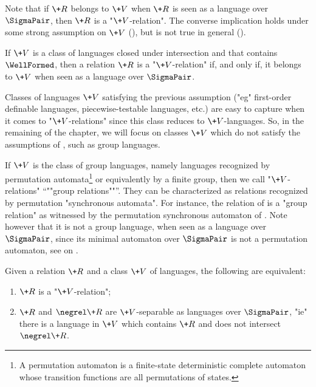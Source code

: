 Note that if $\+R$ belongs to $\+V$ when $\+R$ is seen as a language over $\SigmaPair$,
then $\+R$ is a "$\+V$-relation".
The converse implication holds under some strong assumption on $\+V$ (),
but is not true in general ().

\begin{fact}
	\AP\label{fact:a-triviality-on-trivial-relations}
	If $\+V$ is a class of languages closed under intersection and that contains $\WellFormed$, then
	a relation $\+R$ is a "$\+V$-relation" if, and only if, it belongs to $\+V$ when seen
	as a language over $\SigmaPair$.
\end{fact}

Classes of languages $\+V$ satisfying the previous assumption ("eg" first-order definable languages, piecewise-testable languages, etc.) are easy to capture when
it comes to "$\+V$-relations" since this class reduces to $\+V$-languages.
So, in the remaining of the chapter, we will focus on classes $\+V$ which do not satisfy
the assumptions of , such as group languages.

\begin{example}
	\AP\label{ex:group-languages}
	If $\+V$ is the class
	of group languages, namely languages recognized by permutation automata\footnote{A permutation 
	automaton is a finite-state deterministic complete automaton whose transition functions are all 
	permutations of states.} or equivalently by a finite group, then we call
	"$\+V$-relations" \AP``""group relations""''. They can be characterized 
	as relations recognized by permutation "synchronous automata". For instance, the relation
	of  is a "group relation" as witnessed by the permutation synchronous automaton of . Note however that it is not a group language, when seen as a language over $\SigmaPair$, since its minimal automaton over $\SigmaPair$ is not
	a permutation automaton, see  on .
\end{example}

\begin{fact}
	\AP\label{fact:separability}
	Given a relation $\+R$ and a class $\+V$ of languages, the following are equivalent:
	\begin{enumerate}
		\item $\+R$ is a "$\+V$-relation";
		\item $\+R$ and $\negrel \+R$ are $\+V$-separable as languages over $\SigmaPair$,
		"ie" there is a language in $\+V$ which contains $\+R$ and does not intersect $\negrel \+R$.
	\end{enumerate}
\end{fact}

